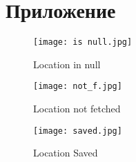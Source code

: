 \chapter*{Приложение}

\begin{figure}[h] %
    \centering
    \texttt{[image: is null.jpg]} %
    \caption{Location in null}
    \label{fig:myimage1}
\end{figure}

\begin{figure}[h] %
    \centering
    \texttt{[image: not\_f.jpg]} %
    \caption{Location not fetched}
    \label{fig:myimage2}
\end{figure}


\begin{figure}[h] %
    \centering
    \texttt{[image: saved.jpg]} %
    \caption{Location Saved}
    \label{fig:myimage3}
\end{figure}
